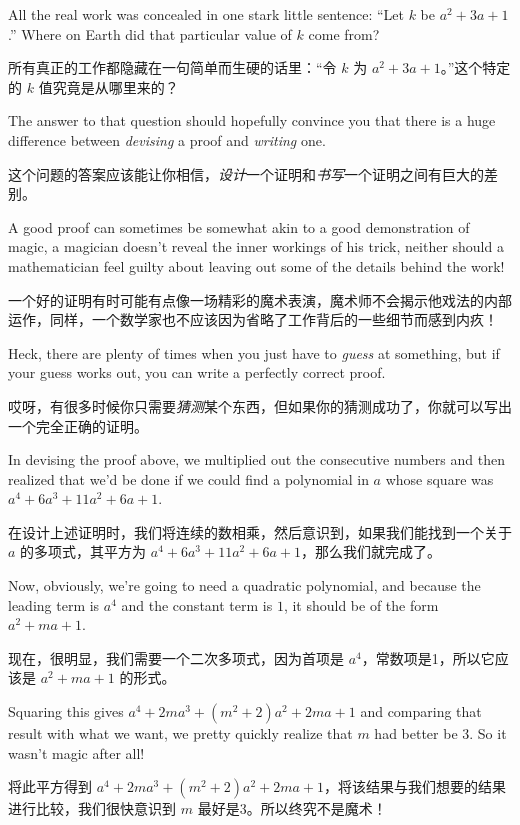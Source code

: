 All
the real work was concealed in one stark little sentence:
``Let $k$ be $a^2+3a+1$.''   Where on Earth did that particular value
of $k$ come from?

所有真正的工作都隐藏在一句简单而生硬的话里：“令 $k$ 为 $a^2+3a+1$。”这个特定的 $k$ 值究竟是从哪里来的？

The answer to that question should hopefully
convince you that there is a huge difference between \emph{devising}
a proof and \emph{writing} one.

这个问题的答案应该能让你相信，\emph{设计}一个证明和\emph{书写}一个证明之间有巨大的差别。

A good proof can sometimes be
somewhat akin to a good demonstration of magic, a magician doesn't
reveal the inner workings of his trick, neither should a mathematician
feel guilty about leaving out some of the details behind the work!

一个好的证明有时可能有点像一场精彩的魔术表演，魔术师不会揭示他戏法的内部运作，同样，一个数学家也不应该因为省略了工作背后的一些细节而感到内疚！

Heck, there are plenty of times when you just have to \emph{guess}
at something, but if your guess works out, you can write
a perfectly correct proof.

哎呀，有很多时候你只需要\emph{猜测}某个东西，但如果你的猜测成功了，你就可以写出一个完全正确的证明。

In devising the proof above, we multiplied out the consecutive numbers
and then realized that we'd be done if we could find a polynomial in
$a$ whose square was $a^4  + 6a^3 + 11a^2 + 6a + 1$.

在设计上述证明时，我们将连续的数相乘，然后意识到，如果我们能找到一个关于 $a$ 的多项式，其平方为 $a^4  + 6a^3 + 11a^2 + 6a + 1$，那么我们就完成了。

Now, obviously,
we're going to need a quadratic polynomial, and because the leading
term is $a^4$ and the constant term is $1$, it should be of the form
$a^2 + ma + 1$.

现在，很明显，我们需要一个二次多项式，因为首项是 $a^4$，常数项是1，所以它应该是 $a^2 + ma + 1$ 的形式。

Squaring this gives $a^4 + 2ma^3 + (m^2+2)a^2 + 2ma + 1$
and comparing that result with what we want, we pretty quickly realize
that $m$ had better be 3.  So it wasn't magic after all!

将此平方得到 $a^4 + 2ma^3 + (m^2+2)a^2 + 2ma + 1$，将该结果与我们想要的结果进行比较，我们很快意识到 $m$ 最好是3。所以终究不是魔术！

